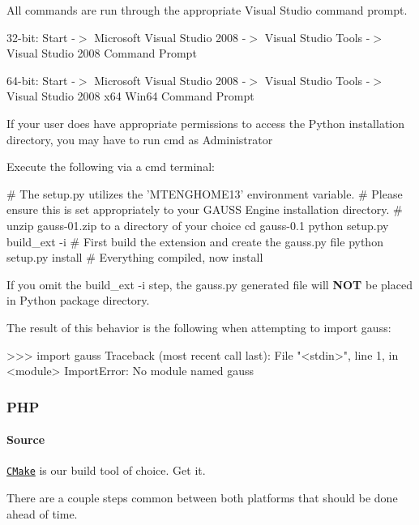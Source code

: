 All commands are run through the appropriate Visual Studio command prompt.

32-\/bit\-: {\ttfamily Start -\/$>$ Microsoft Visual Studio 2008 -\/$>$ Visual Studio Tools -\/$>$ Visual Studio 2008 Command Prompt}

64-\/bit\-: {\ttfamily Start -\/$>$ Microsoft Visual Studio 2008 -\/$>$ Visual Studio Tools -\/$>$ Visual Studio 2008 x64 Win64 Command Prompt}

If your user does have appropriate permissions to access the Python installation directory, you may have to run {\ttfamily cmd} as Administrator

Execute the following via a {\ttfamily cmd} terminal\-:


\begin{DoxyCode}
\textcolor{preprocessor}{# The setup.py utilizes the 'MTENGHOME13' environment variable.}
\textcolor{preprocessor}{}\textcolor{preprocessor}{# Please ensure this is set appropriately to your GAUSS Engine installation directory.}
\textcolor{preprocessor}{}\textcolor{preprocessor}{# unzip gauss-01.zip to a directory of your choice}
\textcolor{preprocessor}{}cd gauss-0.1
python setup.py build\_ext -i      # First build the extension and create the gauss.py file
python setup.py install           # Everything compiled, now install
\end{DoxyCode}


If you omit the {\ttfamily build\-\_\-ext -\/i} step, the {\ttfamily gauss.\-py} generated file will {\bfseries N\-O\-T} be placed in Python package directory.

The result of this behavior is the following when attempting to {\ttfamily import gauss}\-: \begin{DoxyVerb}>>> import gauss
Traceback (most recent call last):
  File "<stdin>", line 1, in <module>
ImportError: No module named gauss
\end{DoxyVerb}


\subsubsection*{P\-H\-P}

\paragraph*{Source}

\href{http://www.cmake.org}{\tt C\-Make} is our build tool of choice. Get it.

There are a couple steps common between both platforms that should be done ahead of time.


